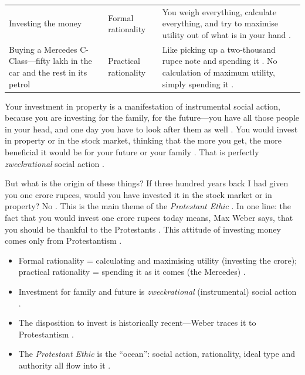 \vspace{6pt}
\noindent
\begin{tabularx}{\textwidth}{>{\hsize}Y >{\hsize}Y >{\hsize}Y}
\toprule
{}
 &  &  \\
\midrule
Investing the money & Formal rationality & You weigh everything, calculate everything, and try to maximise utility out of what is in your hand . \\
\midrule
Buying a Mercedes C-Class---fifty lakh in the car and the rest in its petrol & Practical rationality & Like picking up a two-thousand rupee note and spending it . No calculation of maximum utility, simply spending it . \\
\bottomrule
\end{tabularx}
\vspace{6pt}

Your investment in property is a manifestation of instrumental social action, because you are investing for the family, for the future---you have all those people in your head, and one day you have to look after them as well . You would invest in property or in the stock market, thinking that the more you get, the more beneficial it would be for your future or your family . That is perfectly \textit{zweckrational} social action .

\begin{KeyConcept}
But what is the origin of these things? If three hundred years back I had given you one crore rupees, would you have invested it in the stock market or in property? No .
This is the main theme of the \textit{Protestant Ethic} . In one line: the fact that you would invest one crore rupees today means, Max Weber says, that you should be thankful to the Protestants . This attitude of investing money comes only from Protestantism .
\end{KeyConcept}

\begin{QuickRevision}
\begin{itemize}
    \item Formal rationality = calculating and maximising utility (investing the crore); practical rationality = spending it as it comes (the Mercedes) .
    \item Investment for family and future is \textit{zweckrational} (instrumental) social action .
    \item The disposition to invest is historically recent---Weber traces it to Protestantism .
    \item The \textit{Protestant Ethic} is the ``ocean'': social action, rationality, ideal type and authority all flow into it .
\end{itemize}
\end{QuickRevision}

